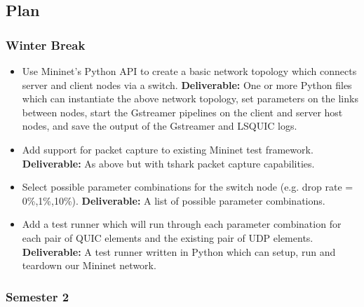 \documentclass[11pt]{article}
\begin{document}
\subsection{Plan}\label{plan}

\subsubsection{Winter Break}

\begin{itemize}
  \item Use Mininet's Python API to create a basic network topology which connects server and client nodes via a switch. \textbf{Deliverable:}
  One or more Python files which can instantiate the above network topology, set parameters on the links between nodes, start the Gstreamer pipelines on the client and server host nodes, and save the output of the Gstreamer and LSQUIC logs.
  \item Add support for packet capture to existing Mininet test framework. \textbf{Deliverable:}
  As above but with tshark packet capture capabilities.
  \item Select possible parameter combinations for the switch node (e.g. drop rate = 0\%,1\%,10\%). \textbf{Deliverable:} A list of possible parameter combinations.
  \item Add a test runner which will run through each parameter combination for each pair of QUIC elements and the existing pair of UDP elements. \textbf{Deliverable:} A test runner written in Python which can setup, run and teardown our Mininet network.
\end{itemize}

\subsubsection{Semester 2}
\end{document}

